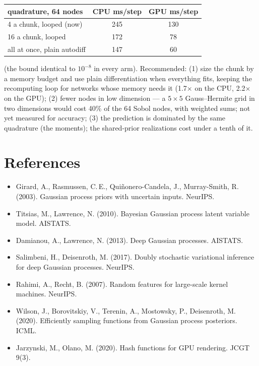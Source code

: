 \documentclass[11pt,a4paper]{article}
\begin{document}
\begin{center}
\begin{tabular}{lcc}
\toprule
quadrature, 64 nodes & CPU ms/step & GPU ms/step \\
\midrule
4 a chunk, looped (now) & 245 & 130 \\
16 a chunk, looped & 172 & 78 \\
all at once, plain autodiff & 147 & 60 \\
\bottomrule
\end{tabular}
\end{center}

\noindent (the bound identical to $10^{-8}$ in every arm). Recommended:
(1) size the chunk by a memory budget and use plain differentiation when
everything fits, keeping the recomputing loop for networks whose memory
needs it (1.7$\times$ on the CPU, 2.2$\times$ on the GPU); (2) fewer nodes
in low dimension --- a $5\times5$ Gauss--Hermite grid in two dimensions
would cost 40\% of the 64 Sobol nodes, with weighted sums; not yet
measured for accuracy; (3) the prediction is dominated by the same
quadrature (the moments); the shared-prior realizations cost under a
tenth of it.

\section*{References}
\begin{itemize}\itemsep0pt
\item Girard, A., Rasmussen, C.\,E., Quiñonero-Candela, J., Murray-Smith, R. (2003). Gaussian process priors with uncertain inputs. NeurIPS.
\item Titsias, M., Lawrence, N. (2010). Bayesian Gaussian process latent variable model. AISTATS.
\item Damianou, A., Lawrence, N. (2013). Deep Gaussian processes. AISTATS.
\item Salimbeni, H., Deisenroth, M. (2017). Doubly stochastic variational inference for deep Gaussian processes. NeurIPS.
\item Rahimi, A., Recht, B. (2007). Random features for large-scale kernel machines. NeurIPS.
\item Wilson, J., Borovitskiy, V., Terenin, A., Mostowsky, P., Deisenroth, M. (2020). Efficiently sampling functions from Gaussian process posteriors. ICML.
\item Jarzynski, M., Olano, M. (2020). Hash functions for GPU rendering. JCGT 9(3).
\end{itemize}
\end{document}
